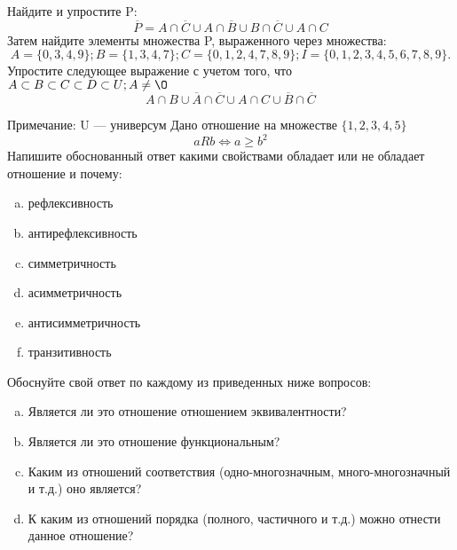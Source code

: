 \documentclass[10pt]{exam}
\begin{document}
\begin{questions}
\question
Найдите и упростите P:
\begin{equation*}
\overline{P} = A \cap \overline{C} \cup A \cap \overline{B} \cup B \cap \overline{C} \cup A \cap C
\end{equation*}
Затем найдите элементы множества P, выраженного через множества:
\begin{equation*}
A = \{0, 3, 4, 9\}; 
B = \{1, 3, 4, 7\};
C = \{0, 1, 2, 4, 7, 8, 9\};
I = \{0, 1, 2, 3, 4, 5, 6, 7, 8, 9\}.
\end{equation*}\question
Упростите следующее выражение с учетом того, что $A\subset B \subset C \subset D \subset U; A \neq \O$
\begin{equation*}
A \cap B \cup \overline{A} \cap \overline{C} \cup A \cap C \cup \overline{B} \cap \overline{C}
\end{equation*}

Примечание: U — универсум\question
Дано отношение на множестве $\{1, 2, 3, 4, 5\}$ 
\begin{equation*}
aRb \iff a \geq b^2
\end{equation*}
Напишите обоснованный ответ какими свойствами обладает или не обладает отношение и почему:   
\begin{enumerate} [a)]\setcounter{enumi}{0}
\item рефлексивность
\item антирефлексивность
\item симметричность
\item асимметричность
\item антисимметричность
\item транзитивность
\end{enumerate}

Обоснуйте свой ответ по каждому из приведенных ниже вопросов:
\begin{enumerate} [a)]\setcounter{enumi}{0}
    \item Является ли это отношение отношением эквивалентности?
    \item Является ли это отношение функциональным?
    \item Каким из отношений соответствия (одно-многозначным, много-многозначный и т.д.) оно является?
    \item К каким из отношений порядка (полного, частичного и т.д.) можно отнести данное отношение?
\end{enumerate}



\end{questions}
\end{document}
